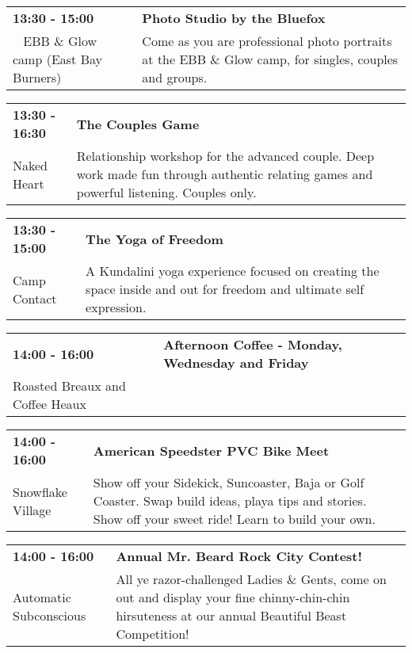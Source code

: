 \begin{tabular}{ p{1in} p{2.2in} }
    \textbf{13:30 - 15:00} & \textbf{Photo Studio by the Bluefox} \\
    ~ \newline EBB \& Glow camp (East Bay Burners) & Come as you are professional photo portraits at the EBB \& Glow camp, for singles, couples and groups. \\
    \hline 
\end{tabular}
    
\begin{tabular}{ p{1in} p{2.2in} }
    \textbf{13:30 - 16:30} & \textbf{The Couples Game} \\
    Naked Heart \newline  & Relationship workshop for the advanced couple. Deep work made fun through authentic relating games and powerful listening. Couples only. \\
    \hline 
\end{tabular}
    
\begin{tabular}{ p{1in} p{2.2in} }
    \textbf{13:30 - 15:00} & \textbf{The Yoga of Freedom} \\
    Camp Contact \newline  & A Kundalini yoga experience focused on creating the space inside and out for freedom and ultimate self expression. \\
    \hline 
\end{tabular}
    
\begin{tabular}{ p{1in} p{2.2in} }
    \textbf{14:00 - 16:00} & \textbf{Afternoon Coffee - Monday, Wednesday and Friday} \\
    Roasted Breaux and Coffee Heaux \newline  &  \\
    \hline 
\end{tabular}
    
\begin{tabular}{ p{1in} p{2.2in} }
    \textbf{14:00 - 16:00} & \textbf{American Speedster PVC Bike Meet} \\
    Snowflake Village \newline  & Show off your Sidekick, Suncoaster, Baja or Golf Coaster. Swap build ideas, playa tips and stories. Show off your sweet ride! Learn to build your own. \\
    \hline 
\end{tabular}
    
\begin{tabular}{ p{1in} p{2.2in} }
    \textbf{14:00 - 16:00} & \textbf{Annual Mr. Beard Rock City Contest!} \\
    Automatic Subconscious \newline  & All ye razor-challenged Ladies \& Gents, come on out and display your fine chinny-chin-chin hirsuteness at our annual Beautiful Beast Competition! \\
    \hline 
\end{tabular}
    
